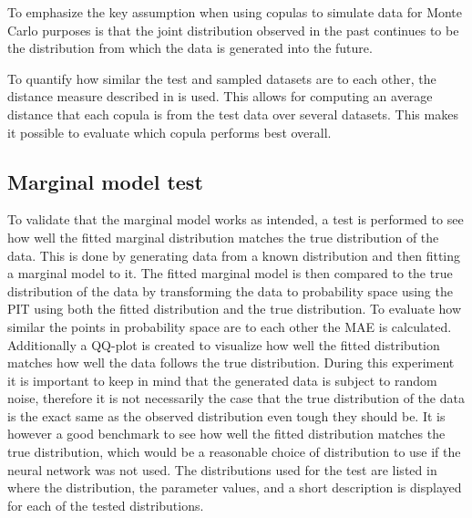 To emphasize the key assumption when using copulas to simulate data for Monte Carlo purposes is that the joint distribution observed in the past continues to be the distribution from which the data is generated into the future. 

To quantify how similar the test and sampled datasets are to each other, the distance measure described in  is used. This allows for computing an average distance that each copula is from the test data over several datasets. This makes it possible to evaluate which copula performs best overall.  


\subsection{Marginal model test}
To validate that the marginal model works as intended, a test is performed to see how well the fitted marginal distribution matches the true distribution of the data. This is done by generating data from a known distribution and then fitting a marginal model to it. The fitted marginal model is then compared to the true distribution of the data by transforming the data to probability space using the \gls{PIT} using both the fitted distribution and the true distribution. To evaluate how similar the points in probability space are to each other the \gls{MAE} is calculated. Additionally a QQ-plot is created to visualize how well the fitted distribution matches how well the data follows the true distribution. During this experiment it is important to keep in mind that the generated data is subject to random noise, therefore it is not necessarily the case that the true distribution of the data is the exact same as the observed distribution even tough they should be. It is however a good benchmark to see how well the fitted distribution matches the true distribution, which would be a reasonable choice of distribution to use if the neural network was not used. The distributions used for the test are listed in  where the distribution, the parameter values, and a short description is displayed for each of the tested distributions.


